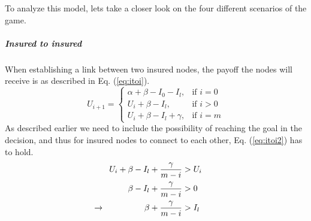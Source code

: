 To analyze this model, lets take a closer look on the four different scenarios of the game.
\subparagraph{Insured to insured}
When establishing a link between two insured nodes, the payoff the nodes will receive is as described in Eq. (\ref{eq:itoi}).
\begin{equation}
    U_{i+1}= 
\begin{cases}
    \alpha + \beta - I_{0} - I_{l},& \text{if } i = 0\\
    U_{i}+\beta -I_{l},& \text{if }  i>0\\
    U_{i}+\beta -I_{l}+\gamma,& \text{if } i=m
    
\end{cases}
\label{eq:itoi}
\end{equation}
As described earlier we need to include the possibility of reaching the goal in the decision, and thus for insured nodes to connect to each other, Eq. (\ref{eq:itoi2}) has to hold.
\begin{eqnarray}
U_{i}+\beta-I_{l}+\frac{\gamma}{m-i}&>U_{i} \nonumber \\ 
\beta-I_{l}+\frac{\gamma}{m-i}&>0 \nonumber \\ 
\llap{$\rightarrow$\hspace{50pt}} \beta+\frac{\gamma}{m-i}&>I_{l} 
\label{eq:itoi2}
\end{eqnarray}


